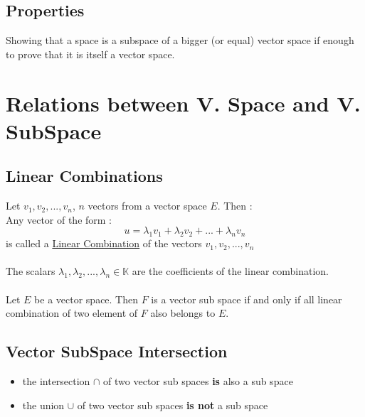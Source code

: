 \documentclass[notitlepage]{math}
\begin{document}
\subsection{Properties}
Showing that a space is a subspace of a bigger (or equal) vector space if enough to prove that it is itself a vector space.
\section{Relations between V. Space and V. SubSpace}
\subsection{Linear Combinations}
Let $v_1,v_2,...,v_n$, $n$ vectors from a vector space $E$. Then :\\
Any vector of the form :
\[u = \lambda_1 v_1 + \lambda_2 v_2 + ... + \lambda_n v_n\]
is called a \underline{Linear Combination} of the vectors $v_1, v_2, ..., v_n$\\ \\
The scalars $\lambda_1, \lambda_2, ..., \lambda_n \in \mathbb{K}$ are the coefficients of the linear combination.\\\\
Let $E$ be a vector space. Then $F$ is a vector sub space if and only if all linear combination of two element of $F$ also belongs to $E$.

\subsection{Vector SubSpace Intersection}
\begin{itemize}
    \item the intersection $\cap$ of two vector sub spaces \textbf{is} also a sub space
    \item the union $\cup$ of two vector sub spaces \textbf{is not} a sub space
\end{itemize}
\end{document}
